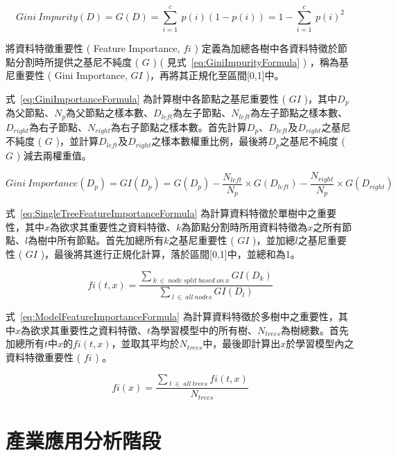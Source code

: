\begin{equation}
  \label{eq:GiniImpurityFormula}
  Gini\ Impurity(D) = G(D) = \sum_{i = 1}^{c}\ p(i) (1 - p(i)) = 1 - \sum_{i = 1}^{c}\ p(i)^2
\end{equation}

將資料特徵重要性 ( Feature Importance, $fi$ ) 定義為加總各樹中各資料特徵於節點分割時所提供之基尼不純度 ( $G$ ) ( 見式~\ref{eq:GiniImpurityFormula} ) ，稱為基尼重要性 ( Gini Importance, $GI$ )，再將其正規化至區間[0,1]中。

式~\ref{eq:GiniImportanceFormula} 為計算樹中各節點之基尼重要性 ( $GI$ )，其中$D_p$為父節點、$N_p$為父節點之樣本數、$D_{left}$為左子節點、$N_{left}$為左子節點之樣本數、$D_{right}$為右子節點、$N_{right}$為右子節點之樣本數。首先計算$D_p$、$D_{left}$及$D_{right}$之基尼不純度 ( $G$ )，並計算$D_{left}$及$D_{right}$之樣本數權重比例，最後將$D_p$之基尼不純度 ( $G$ ) 減去兩權重值。

\begin{equation}
  \label{eq:GiniImportanceFormula}
  Gini\ Importance(D_p) = GI(D_p) = G(D_p) - \frac{N_{left}}{N_p} \times G(D_{left}) - \frac{N_{right}}{N_p} \times G(D_{right})
\end{equation}

式~\ref{eq:SingleTreeFeatureImportanceFormula} 為計算資料特徵於單樹中之重要性，其中$x$為欲求其重要性之資料特徵、$k$為節點分割時所用資料特徵為$x$之所有節點、$l$為樹中所有節點。首先加總所有$k$之基尼重要性 ( $GI$ )，並加總$l$之基尼重要性 ( $GI$ )，最後將其進行正規化計算，落於區間[0,1]中，並總和為1。

\begin{equation}
  \label{eq:SingleTreeFeatureImportanceFormula}
  fi(t,x) = \frac{\sum_{\ k\ \in\ node\ split\ based\ on\ x}GI(D_k)}{\sum_{\ l\ \in\ all\ nodes}GI(D_l)}
\end{equation}

式~\ref{eq:ModelFeatureImportanceFormula} 為計算資料特徵於多樹中之重要性，其中$x$為欲求其重要性之資料特徵、$t$為學習模型中的所有樹、$N_{trees}$為樹總數。首先加總所有$t$中$x$的$fi(t,x)$，並取其平均於$N_{trees}$中，最後即計算出$x$於學習模型內之資料特徵重要性 ( $fi$ ) 。

\begin{equation}
  \label{eq:ModelFeatureImportanceFormula}
  fi(x) = \frac{\sum_{\ t\ \in\ all\ trees}fi(t,x)}{N_{trees}}
\end{equation}

\section{產業應用分析階段}
\label{sec:ApplicationAnalysis}

